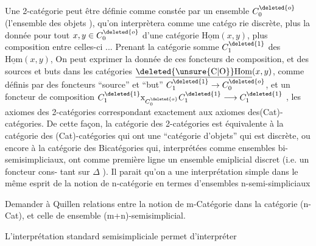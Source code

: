 Une 2-catégorie peut être définie comme constée par un ensemble
 $C^{\deleted{o}}_0$ (l'ensemble des objets ), qu'on interprètera comme une catégo\linebreak
rie discrète, plus la donnée pour tout $x,y \in C^{\deleted{o}}_0$ d'une catégorie $\underline{\mathrm{Hom}}(x,y)$,
plus   composition entre celles\deleted{(}-ci ... Prenant la catégorie somme  $C^{\deleted{1}}_1$
des $\underline{\mathrm{Hom}}(x,y)$, On peut exprimer la donnée de ces foncteurs de composition,
et des sources et buts  dans les catégories $\underline{\deleted{\unsure{\mathrm{C}|\mathrm{O}}}\mathrm{Hom}}(x,y)$, comme définis par
des foncteurs ``source'' et ``but'' $C^{\deleted{1}}_1 \to C^{\deleted{o}}_0$, et un foncteur de composition
$C^{\deleted{1}}_1 \mathrm{x}_{C^{\deleted{o}}_0} C^{\deleted{1}}_1 \longrightarrow C^{\deleted{1}}_1$ , les axiomes des 2-catégories correspondant exactement aux
axiomes des(Cat)-catégories. De cette façon, la catégorie des 2-catégories
est équivalente à la catégorie des (Cat)-catégories qui ont une ``catégorie
d'objets'' qui est discrète, ou encore à la catégorie des Bicatégories
qui, interprétées comme ensembles bi-semisimpliciaux, ont  comme
première ligne un ensemble emiplicial discret (i.e. un foncteur cons-\linebreak
tant sur $\Delta$ ). Il parait qu'on a une interprétation simple dans le même
esprit de la notion de n-catégorie en termes d'ensembles n-semi-simpliciaux

 Demander à Quillen relations entre la notion de m-Catégorie dans
la catégorie (n-Cat), et celle de ensemble (m+n)-semisimplicial.\linebreak
{}

L'interprétation standard semisimpliciale permet d'interpréter


